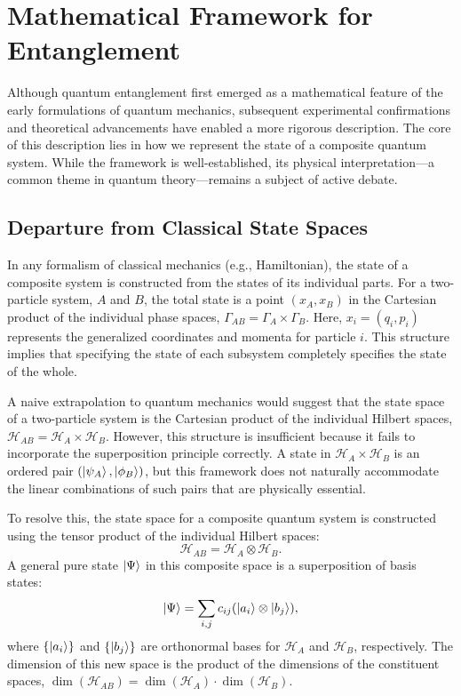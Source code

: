 \section{Mathematical Framework for Entanglement}
\label{sec:math_framework}

Although quantum entanglement first emerged as a mathematical feature of the
early formulations of quantum mechanics, subsequent experimental confirmations
and theoretical advancements have enabled a more rigorous description.
The core of this description lies in how we represent the state of a
composite quantum system. While the framework is well-established, its
physical interpretation---a common theme in quantum theory---remains a
subject of active debate.

\subsection{Departure from Classical State Spaces}
\label{sub:departure_classical}

In any formalism of classical mechanics (e.g., Hamiltonian), the state of a
composite system is constructed from the states of its individual parts.
For a two-particle system, $A$ and $B$, the total state is a point
$(x_A, x_B)$ in the Cartesian product of the individual
phase spaces, $\Gamma_{AB} = \Gamma_A \times \Gamma_B$.
Here, $x_i = (q_i, p_i)$ represents the generalized coordinates and
momenta for particle $i$. This structure implies that specifying the state of
each subsystem completely specifies the state of the whole.

A naive extrapolation to quantum mechanics would suggest that the state space
of a two-particle system is the Cartesian product of the individual Hilbert
spaces, $\mathcal{H}_{AB} = \mathcal{H}_A \times \mathcal{H}_B$. However, this
structure is insufficient because it fails to incorporate the
superposition principle correctly. A state in
$\mathcal{H}_A \times \mathcal{H}_B$ is an ordered pair $(\ket{\psi_A},
\ket{\phi_B})$, but this framework does not naturally accommodate the
linear combinations of such pairs that are physically essential.

To resolve this, the state space for a composite quantum system is
constructed using the tensor product of the individual Hilbert
spaces:
\begin{equation}
	\mathcal{H}_{AB} = \mathcal{H}_A \otimes \mathcal{H}_B.
\end{equation}
A general pure state $\ket{\Psi}$ in this composite space is a superposition
of basis states:
\begin{equation}
	\ket{\Psi} = \sum_{i,j} c_{ij} (\ket{a_i} \otimes \ket{b_j}),
	\label{eq:general_state}
\end{equation}
where $\{\ket{a_i}\}$ and $\{\ket{b_j}\}$ are orthonormal bases for
$\mathcal{H}_A$ and $\mathcal{H}_B$, respectively. The dimension of this new
space is the product of the dimensions of the constituent spaces,
$\dim(\mathcal{H}_{AB}) = \dim(\mathcal{H}_A) \cdot \dim(\mathcal{H}_B)$.

